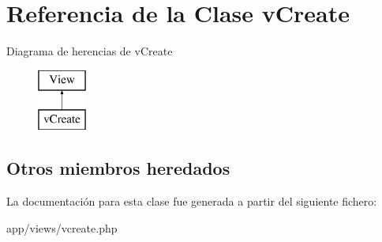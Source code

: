 \hypertarget{classv_create}{}\section{Referencia de la Clase v\+Create}
\label{classv_create}
Diagrama de herencias de v\+Create\begin{figure}[H]
\begin{center}
\leavevmode
\includegraphics[height=2.000000cm]{classv_create}
\end{center}
\end{figure}
\subsection*{Otros miembros heredados}


La documentación para esta clase fue generada a partir del siguiente fichero\+:\begin{DoxyCompactItemize}
\item 
app/views/vcreate.\+php\end{DoxyCompactItemize}
